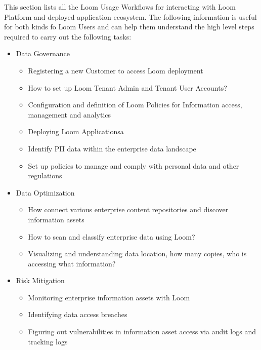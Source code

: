 \documentclass[letterpaper,10pt,english]{sphinxmanual}
\begin{document}
This section lists all the Loom Usage Workflows for interacting with Loom Platform and deployed application ecosystem.  The following information is useful for both kinds fo Loom Users and can help them understand the high level steps required to carry out the following tasks:
\begin{itemize}
\item {} 
Data Governance
\begin{itemize}
\item {} 
Registering a new Customer to access Loom deployment

\item {} 
How to set up Loom Tenant Admin and Tenant User Accounts?

\item {} 
Configuration and definition of Loom Policies for Information access, management and analytics

\item {} 
Deploying Loom Applicationsa

\item {} 
Identify PII data within the enterprise data landscape

\item {} 
Set up policies to manage and comply with personal data and other regulations

\end{itemize}

\item {} 
Data Optimization
\begin{itemize}
\item {} 
How connect various enterprise content repositories and discover information assets

\item {} 
How to scan and classify enterprise data using Loom?

\item {} 
Visualizing and understanding data location, how many copies, who is accessing what information?

\end{itemize}

\item {} 
Risk Mitigation
\begin{itemize}
\item {} 
Monitoring enterprise information assets with Loom

\item {} 
Identifying data access breaches

\item {} 
Figuring out vulnerabilities in information asset access via audit logs and tracking logs


\end{itemize}
\end{itemize}
\end{document}
